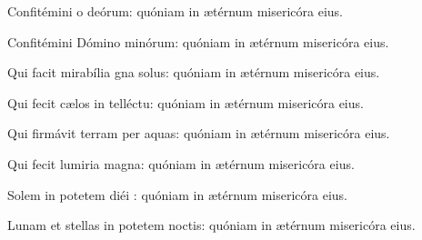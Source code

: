 \item {}

\item Confitémini o deórum:\psstar{} quóniam in ætérnum misericóra eius.

\item Confitémini Dómino minórum:\psstar{} quóniam in ætérnum misericóra eius.

\item Qui facit mirabília gna solus:\psstar{} quóniam in ætérnum misericóra eius.

\item Qui fecit cælos in telléctu:\psstar{} quóniam in ætérnum misericóra eius.

\item Qui firmávit terram per aquas:\psstar{} quóniam in ætérnum misericóra eius.

\item Qui fecit lumiria magna:\psstar{} quóniam in ætérnum misericóra eius.

\item Solem in potetem diéi :\psstar{} quóniam in ætérnum misericóra eius.

\item Lunam et stellas in potetem noctis:\psstar{} quóniam in ætérnum misericóra eius.
